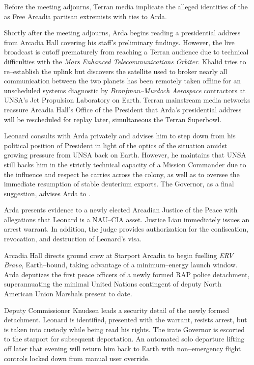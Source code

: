 Before the meeting adjourns, Terran media implicate the alleged identities of the  as Free Arcadia partisan extremists with ties to Arda.

Shortly after the meeting adjourns, Arda begins reading a presidential address from Arcadia Hall covering his staff's preliminary findings. However, the live broadcast is cutoff prematurely from reaching a Terran audience due to technical difficulties with the {\it Mars Enhanced Telecommunications Orbiter}. Khalid tries to re--establish the uplink but discovers the satellite used to broker nearly all communication between the two planets has been remotely taken offline for an unscheduled systems diagnostic by {\it Bronfman--Murdoch Aerospace} contractors at UNSA's Jet Propulsion Laboratory on Earth. Terran mainstream media networks reassure Arcadia Hall's Office of the President that Arda's presidential address will be rescheduled for replay later, simultaneous the Terran Superbowl.

Leonard consults with Arda privately and advises him to step down from his political position of President in light of the optics of the situation amidst growing pressure from UNSA back on Earth. However, he maintains that UNSA still backs him in the strictly technical capacity of a Mission Commander due to the influence and respect he carries across the colony, as well as to oversee the immediate resumption of stable deuterium exports. The Governor, as a final suggestion, advises Arda to .
\StopTimelineDate

Arda presents evidence to a newly elected Arcadian Justice of the Peace with allegations that Leonard is a NAU--CIA asset. Justice Liau immediately issues an arrest warrant. In addition, the judge provides authorization for the confiscation, revocation, and destruction of Leonard's visa.

Arcadia Hall directs ground crew at Starport Arcadia to begin fuelling {\it ERV Bravo}, Earth--bound, taking advantage of a minimum--energy launch window. Arda deputizes the first peace officers of a newly formed RAP police detachment, superannuating the minimal United Nations contingent of deputy North American Union Marshals present to date.

Deputy Commissioner Knudsen leads a security detail of the newly formed detachment. Leonard is identified, presented with the warrant, resists arrest, but is taken into custody while being read his rights. The irate Governor is escorted to the starport for subsequent deportation. An automated solo departure lifting off later that evening will return him back to Earth with non--emergency flight controls locked down from manual user override.
\StopTimelineDate

